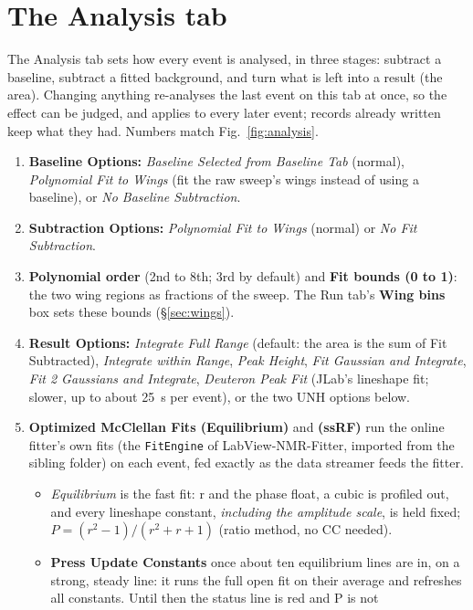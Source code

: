 \documentclass[11pt]{article}
\newcommand{\code}[1]{\texttt{\begingroup\def\_{\textunderscore\allowbreak}#1\endgroup}}
\newcommand{\btn}[1]{\textsf{\textbf{#1}}}   %
\begin{document}
\section{The Analysis tab}
\label{sec:analysis}
The Analysis tab sets how every event is analysed, in three stages: subtract a baseline, subtract a fitted
background, and turn what is left into a result (the area). Changing anything re-analyses the last event on this
tab at once, so the effect can be judged, and applies to every later event; records already written keep what
they had. Numbers match Fig.~\ref{fig:analysis}.
\begin{enumerate}
\item \textbf{Baseline Options:} \emph{Baseline Selected from Baseline Tab} (normal), \emph{Polynomial Fit to Wings}
  (fit the raw sweep's wings instead of using a baseline), or \emph{No Baseline Subtraction}.
\item \textbf{Subtraction Options:} \emph{Polynomial Fit to Wings} (normal) or \emph{No Fit Subtraction}.
\item \textbf{Polynomial order} (2nd to 8th; 3rd by default) and \textbf{Fit bounds (0 to 1)}: the two wing regions as
  fractions of the sweep. The Run tab's \btn{Wing bins} box sets these bounds (\S\ref{sec:wings}).
\item \textbf{Result Options:} \emph{Integrate Full Range} (default: the area is the sum of Fit Subtracted),
  \emph{Integrate within Range}, \emph{Peak Height}, \emph{Fit Gaussian and Integrate}, \emph{Fit 2 Gaussians and
  Integrate}, \emph{Deuteron Peak Fit} (JLab's lineshape fit; slower, up to about 25~s per event), or the two
  UNH options below.
\item[] \textbf{Optimized McClellan Fits (Equilibrium)} and \textbf{(ssRF)} run the online fitter's own fits
  (the \code{FitEngine} of LabView-NMR-Fitter, imported from the sibling folder) on each event, fed exactly as the
  data streamer feeds the fitter.
  \begin{itemize}
  \item \emph{Equilibrium} is the fast fit: r and the phase float, a cubic is profiled out, and every lineshape
    constant, \emph{including the amplitude scale}, is held fixed; $P=(r^2-1)/(r^2+r+1)$ (ratio method, no CC needed).
  \item \textbf{Press Update Constants} once about ten equilibrium lines are in, on a strong, steady line: it runs the
    full open fit on their average and refreshes all constants. Until then the status line is red and P is not

\end{itemize}
\end{enumerate}
\end{document}
